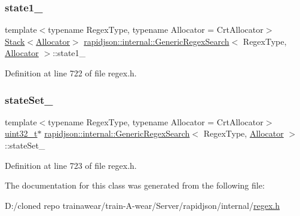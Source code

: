 \subsubsection{\texorpdfstring{state1\_}{state1\_}}
{\footnotesize\ttfamily template$<$typename Regex\+Type, typename Allocator = Crt\+Allocator$>$ \\
\mbox{\hyperlink{classrapidjson_1_1internal_1_1_stack}{Stack}}$<$\mbox{\hyperlink{classrapidjson_1_1_allocator}{Allocator}}$>$ \mbox{\hyperlink{classrapidjson_1_1internal_1_1_generic_regex_search}{rapidjson\+::internal\+::\+Generic\+Regex\+Search}}$<$ Regex\+Type, \mbox{\hyperlink{classrapidjson_1_1_allocator}{Allocator}} $>$\+::state1\+\_\+\hspace{0.3cm}{\ttfamily [private]}}



Definition at line 722 of file regex.\+h.

\mbox{\label{classrapidjson_1_1internal_1_1_generic_regex_search_a13721765fd14d32048c63b12bff5e005}} 
\subsubsection{\texorpdfstring{stateSet\_}{stateSet\_}}
{\footnotesize\ttfamily template$<$typename Regex\+Type, typename Allocator = Crt\+Allocator$>$ \\
\mbox{\hyperlink{stdint_8h_a435d1572bf3f880d55459d9805097f62}{uint32\+\_\+t}}$\ast$ \mbox{\hyperlink{classrapidjson_1_1internal_1_1_generic_regex_search}{rapidjson\+::internal\+::\+Generic\+Regex\+Search}}$<$ Regex\+Type, \mbox{\hyperlink{classrapidjson_1_1_allocator}{Allocator}} $>$\+::state\+Set\+\_\+\hspace{0.3cm}{\ttfamily [private]}}



Definition at line 723 of file regex.\+h.



The documentation for this class was generated from the following file\+:\begin{DoxyCompactItemize}
\item 
D\+:/cloned repo trainawear/train-\/\+A-\/wear/\+Server/rapidjson/internal/\mbox{\hyperlink{regex_8h}{regex.\+h}}\end{DoxyCompactItemize}
